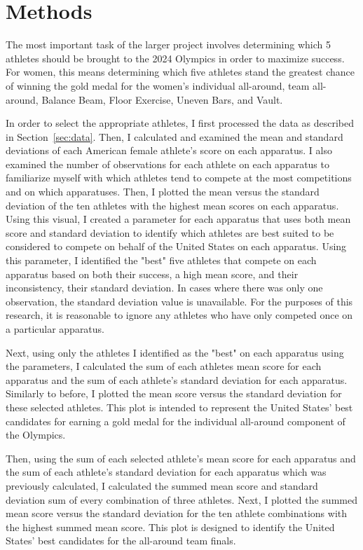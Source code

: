 \documentclass[12pt]{article}
\begin{document}
\section{Methods}
\label{sec:meth}

The most important task of the larger project involves determining which 5 athletes
should be brought to the 2024 Olympics in order to maximize success. For women, this means determining 
which five athletes stand the greatest chance of winning the gold medal for the women's individual all-around,
team all-around, Balance Beam, Floor Exercise, Uneven Bars, and Vault. 

In order to select the appropriate athletes, I first processed the data as described in Section~\ref{sec:data}.
Then, I calculated and examined the mean and standard deviations of each American female athlete's score 
on each apparatus. I also examined the number of observations for each athlete on each apparatus to familiarize 
myself with which athletes tend to compete at the most competitions and on which apparatuses. Then, I plotted 
the mean versus the standard deviation of the ten athletes with the highest mean scores on each apparatus. 
Using this visual, I created a parameter for each apparatus that uses both mean score and standard 
deviation to identify which athletes are best suited to be considered to compete on behalf of the United 
States on each apparatus. Using this parameter, I identified the "best" five athletes that compete on
each apparatus based on both their success, a high mean score, and their inconsistency, their standard deviation. 
In cases where there was only one observation, the standard deviation value is unavailable.
For the purposes of this research, it is reasonable to ignore any athletes who have only competed once on a particular apparatus.

Next, using only the athletes I identified as the "best" on each apparatus using the parameters, 
I calculated the sum of each athletes mean score for each apparatus and the sum of each athlete's standard 
deviation for each apparatus. Similarly to before, I plotted the mean score versus the standard deviation for 
these selected athletes. This plot is intended to represent
the United States' best candidates for earning a gold medal for the individual all-around component of the Olympics.

Then, using the sum of each selected athlete's mean score for each apparatus and the sum of each athlete's standard 
deviation for each apparatus which was previously calculated, I calculated the summed mean score and standard deviation sum 
of every combination of three athletes. Next, I plotted the summed mean score versus the standard deviation for the ten 
athlete combinations with the highest summed mean score. This plot is designed to identify the United States' best 
candidates for the all-around team finals.
\end{document}
